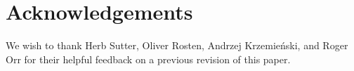 \section*{Acknowledgements}

We wish to thank Herb Sutter, Oliver Rosten, Andrzej Krzemie\' nski, and Roger Orr for their helpful feedback on a previous revision of this paper.


\renewcommand{\addcontentsline}[3]{}%







